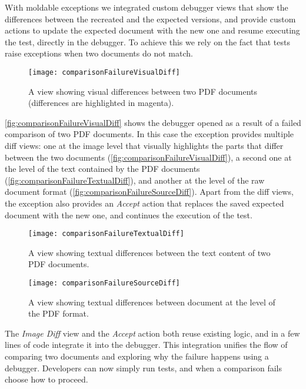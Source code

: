\documentclass[sigplan,anonymous,review,10pt]{acmart}
\begin{document}
With moldable exceptions we integrated custom debugger views that show the differences between the recreated and the expected versions, and provide custom actions to update the expected document with the new one and resume executing the test, directly in the debugger.
To achieve this we rely on the fact that tests raise  exceptions when two documents do not match.

\begin{figure*}[h]
  \texttt{[image: comparisonFailureVisualDiff]}
  \caption{A view showing visual differences between two PDF documents (differences are highlighted in magenta).}
  \label{fig:comparisonFailureVisualDiff}
\end{figure*}


\autoref{fig:comparisonFailureVisualDiff} shows the debugger opened as a result of a failed comparison of two PDF documents.
In this case the exception provides multiple diff views:
one at the image level that visually highlights the parts that differ between the two documents (\autoref{fig:comparisonFailureVisualDiff}),
a second one at the level of the text contained by the PDF documents (\autoref{fig:comparisonFailureTextualDiff}),
and another at the level of the raw document format (\autoref{fig:comparisonFailureSourceDiff}).
Apart from the diff views, the exception also provides an \emph{Accept} action that replaces the saved expected document with the new one, and continues the execution of the test.

\begin{figure}[h]
  \texttt{[image: comparisonFailureTextualDiff]}
  \caption{A view showing textual differences between the text content of two PDF documents.}
  \label{fig:comparisonFailureTextualDiff}
\end{figure}

\begin{figure}[h]
  \texttt{[image: comparisonFailureSourceDiff]}
  \caption{A view showing textual differences between document at the level of the PDF format.}
  \label{fig:comparisonFailureSourceDiff}
\end{figure}


The \emph{Image Diff} view and the \emph{Accept} action both reuse existing logic, and in a few lines of code integrate it into the debugger.
This integration unifies the flow of comparing two documents and exploring why the failure happens using a debugger.
Developers can now simply run tests, and when a comparison fails choose how to proceed.
\end{document}
